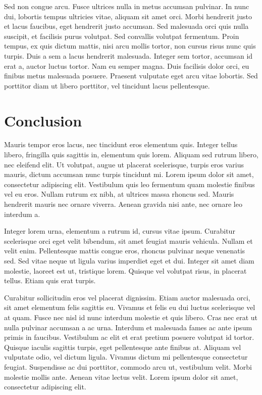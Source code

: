 \documentclass[aps,11pt, twocolumn]{revtex4-1}
\begin{document}
Sed non congue arcu. Fusce ultrices nulla in metus accumsan pulvinar. In nunc dui, lobortis tempus ultricies vitae, aliquam sit amet orci. Morbi hendrerit justo et lacus faucibus, eget hendrerit justo accumsan. Sed malesuada orci quis nulla suscipit, et facilisis purus volutpat. Sed convallis volutpat fermentum. Proin tempus, ex quis dictum mattis, nisi arcu mollis tortor, non cursus risus nunc quis turpis. Duis a sem a lacus hendrerit malesuada. Integer sem tortor, accumsan id erat a, auctor luctus tortor. Nam eu semper magna. Duis facilisis dolor orci, eu finibus metus malesuada posuere. Praesent vulputate eget arcu vitae lobortis. Sed porttitor diam ut libero porttitor, vel tincidunt lacus pellentesque.

\section{Conclusion}

Mauris tempor eros lacus, nec tincidunt eros elementum quis. Integer tellus libero, fringilla quis sagittis in, elementum quis lorem. Aliquam sed rutrum libero, nec eleifend elit. Ut volutpat, augue ut placerat scelerisque, turpis eros varius mauris, dictum accumsan nunc turpis tincidunt mi. Lorem ipsum dolor sit amet, consectetur adipiscing elit. Vestibulum quis leo fermentum quam molestie finibus vel eu eros. Nullam rutrum ex nibh, at ultrices massa rhoncus sed. Mauris hendrerit mauris nec ornare viverra. Aenean gravida nisi ante, nec ornare leo interdum a.

Integer lorem urna, elementum a rutrum id, cursus vitae ipsum. Curabitur scelerisque orci eget velit bibendum, sit amet feugiat mauris vehicula. Nullam et velit enim. Pellentesque mattis congue eros, rhoncus pulvinar neque venenatis sed. Sed vitae neque ut ligula varius imperdiet eget et dui. Integer sit amet diam molestie, laoreet est ut, tristique lorem. Quisque vel volutpat risus, in placerat tellus. Etiam quis erat turpis.

Curabitur sollicitudin eros vel placerat dignissim. Etiam auctor malesuada orci, sit amet elementum felis sagittis eu. Vivamus et felis eu dui luctus scelerisque vel at quam. Fusce nec nisl id nunc interdum molestie et quis libero. Cras nec erat ut nulla pulvinar accumsan a ac urna. Interdum et malesuada fames ac ante ipsum primis in faucibus. Vestibulum ac elit et erat pretium posuere volutpat id tortor. Quisque iaculis sagittis turpis, eget pellentesque ante finibus at. Aliquam vel vulputate odio, vel dictum ligula. Vivamus dictum mi pellentesque consectetur feugiat. Suspendisse ac dui porttitor, commodo arcu ut, vestibulum velit. Morbi molestie mollis ante. Aenean vitae lectus velit. Lorem ipsum dolor sit amet, consectetur adipiscing elit.
\end{document}
